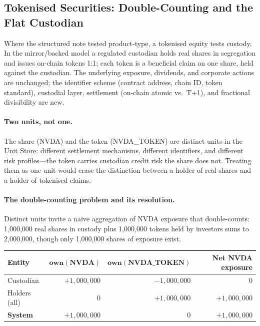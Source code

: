 \documentclass[11pt,a4paper]{article}
\begin{document}
\subsection{Tokenised Securities: Double-Counting and the Flat Custodian}
\label{sec:cdm-tokenized}

Where the structured note tested product-type, a tokenised equity tests custody. In the mirror/backed model a regulated custodian holds real shares in segregation and issues on-chain tokens 1:1; each token is a beneficial claim on one share, held against the custodian. The underlying exposure, dividends, and corporate actions are unchanged; the identifier scheme (contract address, chain ID, token standard), custodial layer, settlement (on-chain atomic vs.\ T+1), and fractional divisibility are new.

\paragraph{Two units, not one.} The share (NVDA) and the token (NVDA\_TOKEN) are distinct units in the Unit Store: different settlement mechanisms, different identifiers, and different risk profiles---the token carries custodian credit risk the share does not. Treating them as one unit would erase the distinction between a holder of real shares and a holder of tokenised claims.

\paragraph{The double-counting problem and its resolution.} Distinct units invite a na\"ive aggregation of NVDA exposure that double-counts: 1{,}000{,}000 real shares in custody plus 1{,}000{,}000 tokens held by investors sums to 2{,}000{,}000, though only 1{,}000{,}000 shares of exposure exist.

\begin{center}\small
\begin{tabular}{@{}lrrr@{}}
\toprule
\textbf{Entity} & $\mathbf{own(NVDA)}$ & $\mathbf{own(NVDA\_TOKEN)}$ & \textbf{Net NVDA exposure} \\
\midrule
Custodian & $+1{,}000{,}000$ & $-1{,}000{,}000$ & $0$ \\
Holders (all) & $0$ & $+1{,}000{,}000$ & $+1{,}000{,}000$ \\
\midrule
\textbf{System} & $+1{,}000{,}000$ & $0$ & $+1{,}000{,}000$ \\
\bottomrule
\end{tabular}
\end{center}
\end{document}
